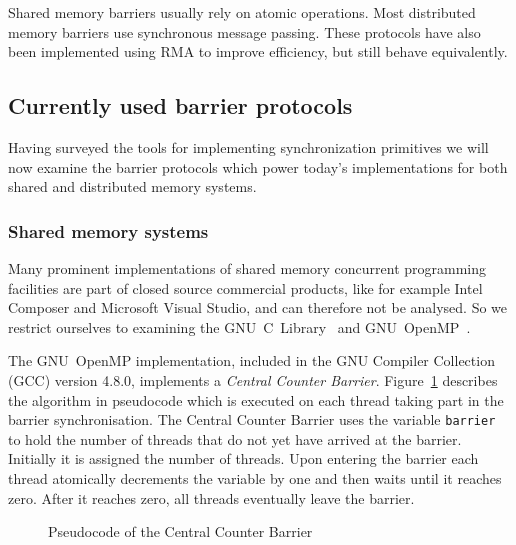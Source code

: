 \documentclass[a4paper, 10pt]{article}
\begin{document}
Shared memory barriers usually rely on atomic operations. Most distributed memory barriers use synchronous message passing. These protocols have also been implemented using RMA to improve efficiency, but still behave equivalently.

\subsection{Currently used barrier protocols}
\label{ssec:background-currently-used}
Having surveyed the tools for implementing synchronization primitives we will now examine the barrier protocols which power today's implementations for both shared and distributed memory systems.

\subsubsection{Shared memory systems}
\label{sssec:background-currently-used-shared}

Many prominent implementations of shared memory concurrent programming facilities are part of closed source commercial products, like for example Intel Composer and Microsoft Visual Studio, and can therefore not be analysed. So we restrict ourselves to examining the GNU~C~Library~\cite{glibc} and GNU~OpenMP~\cite{gomp}.

The GNU~OpenMP implementation, included in the GNU Compiler Collection (GCC) version 4.8.0, implements a \emph{Central Counter Barrier}. Figure~\ref{fig:pseudocode-central-counter} describes the algorithm in pseudocode which is executed on each thread taking part in the barrier synchronisation.
The Central Counter Barrier uses the variable \texttt{barrier} to hold the number of threads that do not yet have arrived at the barrier. Initially it is assigned the number of threads. Upon entering the barrier each thread atomically decrements the variable by one and then waits until it reaches zero. After it reaches zero, all threads eventually leave the barrier.

\begin{figure}[H]
	\centering
	
	\caption{Pseudocode of the Central Counter Barrier}
	\label{fig:pseudocode-central-counter}
\end{figure}
\end{document}

